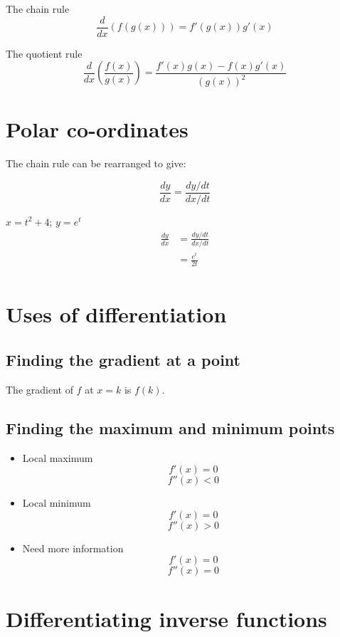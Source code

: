 \documentclass[11pt,a4paper,oneside]{book}
\begin{document}
\begin{thing}{The chain rule}
\[\frac{d}{dx}\left( f(g(x) ) \right) = f'(g(x))g'(x)\]
\end{thing}

\begin{thing}{The quotient rule}
\[\frac{d}{dx}\left( \frac{f(x)}{g(x)} \right) = \frac{f'(x)g(x) - f(x)g'(x)}{(g(x))^2}\]
\end{thing}

\section{Polar co-ordinates}
The chain rule can be rearranged to give:

\begin{in_a_box}
\[\frac{dy}{dx}=\frac{dy/dt}{dx/dt}\]
\end{in_a_box}

\begin{example}
$x=t^2 + 4$; $y=e^t$
\begin{align*}
\frac{dy}{dx}&=\frac{dy/dt}{dx/dt}\\
&=\frac{e^t}{2t}\\
\end{align*}
\end{example}

\section{Uses of differentiation}
\subsection{Finding the gradient at a point}
The gradient of $f$ at $x=k$ is $f(k)$.

\subsection{Finding the maximum and minimum points}
\begin{itemize}
\item Local maximum $$f'(x)=0$$ $$f''(x)<0$$
\item Local minimum $$f'(x)=0$$ $$f''(x)>0$$
\item Need more information $$f'(x)=0$$ $$f''(x)=0$$
\end{itemize}

\section{Differentiating inverse functions}
\end{document}
